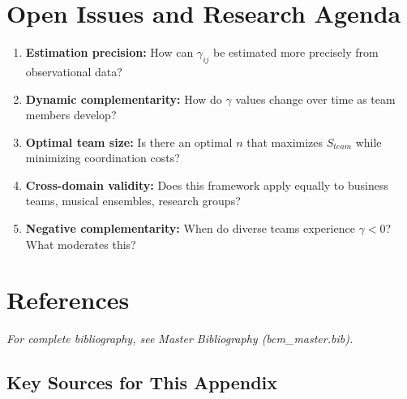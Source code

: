 
\section*{Open Issues and Research Agenda}

\begin{enumerate}
    \item \textbf{Estimation precision:} How can $\gamma_{ij}$ be estimated more
    precisely from observational data?

    \item \textbf{Dynamic complementarity:} How do $\gamma$ values change over
    time as team members develop?

    \item \textbf{Optimal team size:} Is there an optimal $n$ that maximizes
    $S_{team}$ while minimizing coordination costs?

    \item \textbf{Cross-domain validity:} Does this framework apply equally
    to business teams, musical ensembles, research groups?

    \item \textbf{Negative complementarity:} When do diverse teams experience
    $\gamma < 0$? What moderates this?
\end{enumerate}



\section*{References}

\textit{For complete bibliography, see Master Bibliography (bcm\_master.bib).}

\subsection*{Key Sources for This Appendix}

